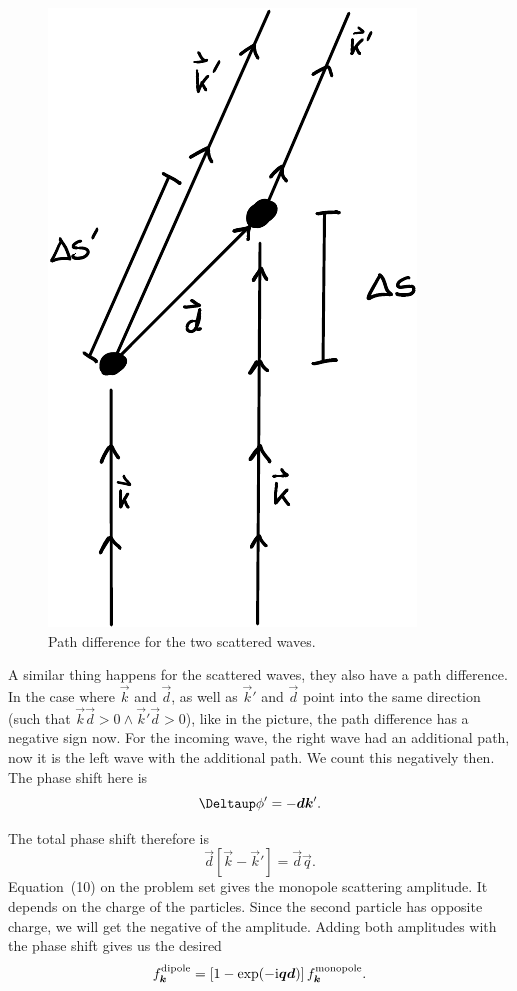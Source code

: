 \documentclass[11pt, english, fleqn, DIV=15, headinclude, BCOR=1.5cm]{scrartcl}
\begin{document}
\begin{figure}[htbp]
    \centering
    \includegraphics{Drawing-0001.pdf}
    \caption{%
        Path difference for the two scattered waves.
    }
    \label{fig:sketch}
\end{figure}

A similar thing happens for the scattered waves, they also have a path
difference. In the case where $\vec k$ and $\vec d$, as well as $\vec k'$ and
$\vec d$ point into the same direction (such that $\vec k \vec d > 0 \land \vec
k' \vec d > 0$), like in the picture, the path difference has a negative sign
now. For the incoming wave, the right wave had an additional path, now it is
the left wave with the additional path. We count this negatively then. The
phase shift here is
\[
    \Deltaup \phi' = - \vec d \vec k'.
\]

The total phase shift therefore is
\[
    \vec d [\vec k - \vec k']
    =
    \vec d \vec q.
\]
Equation~(10) on the problem set gives the monopole scattering amplitude. It
depends on the charge of the particles. Since the second particle has opposite
charge, we will get the negative of the amplitude. Adding both amplitudes with
the phase shift gives us the desired
\[
    f_{\boldsymbol{k}}^\text{dipole}
    = \left[ 1 - \exp(- \mathrm i \boldsymbol{q} \boldsymbol{d}) \right] f_{\boldsymbol{k}}^\text{monopole}.
\]
\end{document}
